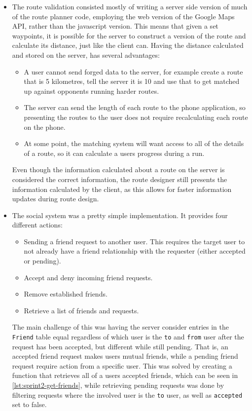 \begin{itemize}
 \item The route validation consisted mostly of writing a server side version of much of the route planner code, employing the web version of the Google Maps \ac{API}, rather than the javascript version. This means that given a set waypoints, it is possible for the server to construct a version of the route and calculate its distance, just like the client can. Having the distance calculated and stored on the server, has several advantages:
 \begin{itemize}
  \item A user cannot send forged data to the server, for example create a route that is 5 kilometres, tell the server it is 10 and use that to get matched up against opponents running harder routes.
  \item The server can send the length of each route to the phone application, so presenting the routes to the user does not require recalculating each route on the phone.
  \item At some point, the matching system will want access to all of the details of a route, so it can calculate a users progress during a run.
 \end{itemize}
 Even though the information calculated about a route on the server is considered the correct information, the route designer still presents the information calculated by the client, as this allows for faster information updates during route design.
 \item The social system was a pretty simple implementation. It provides four different actions:
 \begin{itemize}
  \item Sending a friend request to another user. This requires the target user to not already have a friend relationship with the requester (either accepted or pending).
  \item Accept and deny incoming friend requests.
  \item Remove established friends.
  \item Retrieve a list of friends and requests.
 \end{itemize}
 The main challenge of this was having the server consider entries in the \texttt{Friend} table equal regardless of which user is the \texttt{to} and \texttt{from} user after the request has been accepted, but different while still pending. That is, an accepted friend request makes users mutual friends, while a pending friend request require action from a specific user. This was solved by creating a function that retrieves all of a users accepted friends, which can be seen in \autoref{lst:sprint2-get-friends}, while retrieving pending requests was done by filtering requests where the involved user is the \texttt{to} user, as well as \texttt{accepted} set to false.
\end{itemize}

